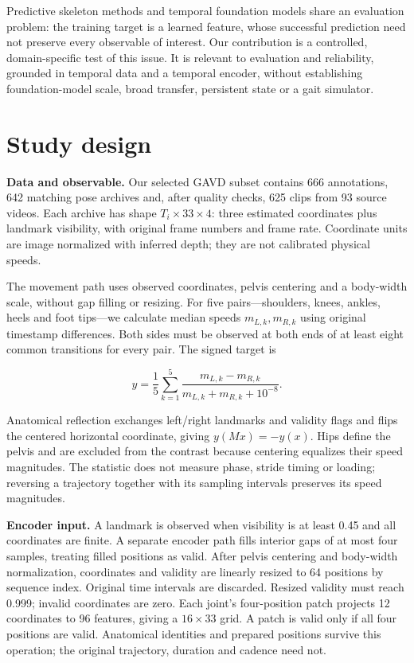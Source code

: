 \documentclass{article}
\begin{document}
Predictive skeleton methods and temporal foundation models share an
evaluation problem: the training target is a learned feature, whose
successful prediction need not preserve every observable of interest.
Our contribution is a controlled, domain-specific test of this issue. It
is relevant to evaluation and reliability, grounded in temporal data and
a temporal encoder, without establishing foundation-model scale, broad
transfer, persistent state or a gait simulator.

\section{Study design}\label{study-design}

\textbf{Data and observable.} Our selected GAVD subset \citep{gavd}
contains 666 annotations, 642 matching pose archives and, after quality
checks, 625 clips from 93 source videos. Each archive has shape
\(T_i\times33\times4\): three estimated coordinates plus landmark
visibility, with original frame numbers and frame rate. Coordinate units
are image normalized with inferred depth; they are not calibrated
physical speeds.

The movement path uses observed coordinates, pelvis centering and a
body-width scale, without gap filling or resizing. For five
pairs---shoulders, knees, ankles, heels and foot tips---we calculate
median speeds \(m_{L,k},m_{R,k}\) using original timestamp differences.
Both sides must be observed at both ends of at least eight common
transitions for every pair. The signed target is

\[y=\frac{1}{5}\sum_{k=1}^{5}\frac{m_{L,k}-m_{R,k}}{m_{L,k}+m_{R,k}+10^{-8}}.\]

Anatomical reflection exchanges left/right landmarks and validity flags
and flips the centered horizontal coordinate, giving \(y(Mx)=-y(x)\).
Hips define the pelvis and are excluded from the contrast because
centering equalizes their speed magnitudes. The statistic does not
measure phase, stride timing or loading; reversing a trajectory together
with its sampling intervals preserves its speed magnitudes.

\textbf{Encoder input.} A landmark is observed when visibility is at
least 0.45 and all coordinates are finite. A separate encoder path fills
interior gaps of at most four samples, treating filled positions as
valid. After pelvis centering and body-width normalization, coordinates
and validity are linearly resized to 64 positions by sequence index.
Original time intervals are discarded. Resized validity must reach
0.999; invalid coordinates are zero. Each joint's four-position patch
projects 12 coordinates to 96 features, giving a \(16\times33\) grid. A
patch is valid only if all four positions are valid. Anatomical
identities and prepared positions survive this operation; the original
trajectory, duration and cadence need not.
\end{document}
